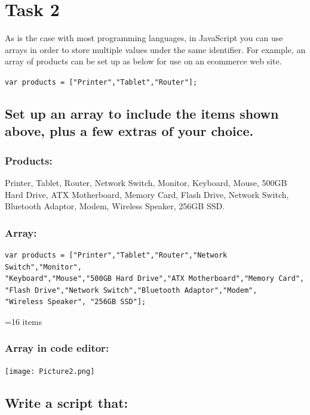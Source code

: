 \documentclass[a4paper]{article}
\begin{document}
\section{Task 2}
As is the case with most programming languages, in JavaScript you can use arrays in order to store multiple values under the same identifier. For example, an array of products can be set up as below for use on an ecommerce web site.\par
  \verb|var products = ["Printer","Tablet","Router"];|

\subsection{Set up an array to include the items shown above, plus a few extras of your choice.}
\subsubsection{Products:}
Printer, Tablet, Router, Network Switch, Monitor, Keyboard, Mouse, 500GB Hard Drive, ATX Motherboard, Memory Card, Flash Drive, Network Switch, Bluetooth Adaptor, Modem, Wireless Speaker, 256GB SSD.
\subsubsection{Array:} 
\begin{lstlisting}
var products = ["Printer","Tablet","Router","Network Switch","Monitor",
"Keyboard","Mouse","500GB Hard Drive","ATX Motherboard","Memory Card",
"Flash Drive","Network Switch","Bluetooth Adaptor","Modem",
"Wireless Speaker", "256GB SSD"];
\end{lstlisting}
=16 items

\subsubsection{Array in code editor:}
\noindent\texttt{[image: Picture2.png]}

\subsection{Write a script that:}
\end{document}
